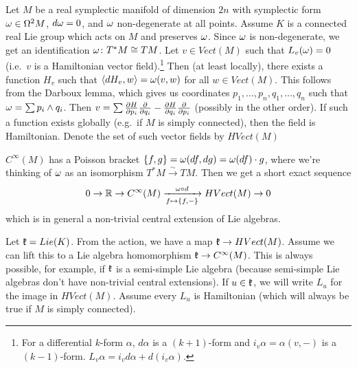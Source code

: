 Let $M$ be a real symplectic manifold of dimension $2n$ with symplectic form $\omega\in \Omega^2M$, $d\omega=0$, and $\omega$ non-degenerate at all points. Assume $K$ is a connected real Lie group which acts on $M$ and preserves $\omega$. Since $\omega$ is non-degenerate, we get an identification $\omega\colon T^*M\cong TM$. Let $v\in Vect(M)$ such that $L_v(\omega)=0$ (i.e.~$v$ is a Hamiltonian vector field).\footnote{For a differential $k$-form $\alpha$, $d\alpha$ is a $(k+1)$-form and $i_v\alpha = \alpha(v,-)$ is a $(k-1)$-form. $L_v\alpha = i_v d\alpha + d(i_v \alpha)$.} Then (at least locally), there exists a function $H_v$ such that $\langle dH_v,w\rangle=\omega(v,w)$ for all $w\in Vect(M)$. This follows from the Darboux lemma, which gives us coordinates $p_1,\dots, p_n, q_1,\dots, q_n$ such that $\omega=\sum p_i\wedge q_i$. Then $v=\sum \frac{\partial H}{\partial p_i}\frac{\partial }{\partial q_i}-\frac{\partial H}{\partial q_i}\frac{\partial }{\partial p_i}$ (possibly in the other order). If such a function exists globally (e.g.~if $M$ is simply connected), then the field is Hamiltonian. Denote the set of such vector fields by $HVect(M)$

$C^\infty(M)$ has a Poisson bracket $\{f,g\}= \omega(df,dg)=\omega(df)\cdot g$, where we're thinking of $\omega$ as an isomorphism $T^*M\xrightarrow\sim TM$. Then we get a short exact sequence
\[
 0\to \mathbb{R}\to C^\infty(M)\xrightarrow[f\mapsto \{f,-\}]{\omega\circ d} HVect(M)\to 0
\]
which is in general a non-trivial central extension of Lie algebras.

Let $\mathfrak{k}=Lie(K)$. From the action, we have a map $\mathfrak{k}\to HVect(M)$. Assume we can lift this to a Lie algebra homomorphism $\mathfrak{k}\to C^\infty(M)$. This is always possible, for example, if $\mathfrak{k}$ is a semi-simple Lie algebra (because semi-simple Lie algebras don't have non-trivial central extensions). If $u\in \mathfrak{k}$, we will write $L_u$ for the image in $HVect(M)$. Assume every $L_u$ is Hamiltonian (which will always be true if $M$ is simply connected). 

